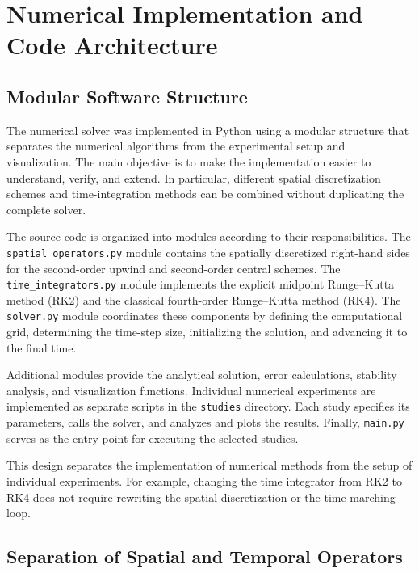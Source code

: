 \section{Numerical Implementation and Code Architecture}
\label{sec:numerical-implementation}

\subsection{Modular Software Structure}
\label{subsec:modular-structure}

The numerical solver was implemented in Python using a modular structure that separates the numerical algorithms from the experimental setup and visualization. The main objective is to make the implementation easier to understand, verify, and extend. In particular, different spatial discretization schemes and time-integration methods can be combined without duplicating the complete solver.

The source code is organized into modules according to their responsibilities. The \texttt{spatial\_operators.py} module contains the spatially discretized right-hand sides for the second-order upwind and second-order central schemes. The \texttt{time\_integrators.py} module implements the explicit midpoint Runge--Kutta method (RK2) and the classical fourth-order Runge--Kutta method (RK4). The \texttt{solver.py} module coordinates these components by defining the computational grid, determining the time-step size, initializing the solution, and advancing it to the final time.

Additional modules provide the analytical solution, error calculations, stability analysis, and visualization functions. Individual numerical experiments are implemented as separate scripts in the \texttt{studies} directory. Each study specifies its parameters, calls the solver, and analyzes and plots the results. Finally, \texttt{main.py} serves as the entry point for executing the selected studies.

This design separates the implementation of numerical methods from the setup of individual experiments. For example, changing the time integrator from RK2 to RK4 does not require rewriting the spatial discretization or the time-marching loop.

\subsection{Separation of Spatial and Temporal Operators}
\label{subsec:operator-separation}


